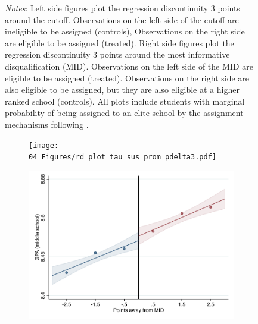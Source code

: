 \documentclass[oneside,11pt]{article}
\begin{document}
\begin{figure}[H]
\footnotesize
\textit{Notes}: Left side figures plot the regression discontinuity 3 points around the cutoff. Observations on the left side of the cutoff are ineligible to be assigned (controls), Observations on the right side are eligible to be assigned (treated). Right side figures plot the regression discontinuity 3 points around the most informative disqualification (MID). Observations on the left side of the MID are eligible to be assigned (treated). Observations on the right side are also eligible to be assigned, but they are also eligible at a higher ranked school (controls). All plots include students with marginal probability of being assigned to an elite school by the assignment mechanisms following \citet{abdulkadirouglu2022breaking}. 
\end{figure}

\begin{figure}[H]

    \ContinuedFloat
    \caption{(Continued) RD plots for balance variables across those assigned to either UNAM or IPN high-school, and those who are not\label{fig:Balance_rd_plot_elite_2}}
    \begin{center}
    
    \begin{subfigure}{0.475\textwidth}
        \centering
        \texttt{[image: 04\_Figures/rd\_plot\_tau\_sus\_prom\_pdelta3.pdf]}
    \end{subfigure}
    \begin{subfigure}{0.475\textwidth}
        \centering
        \includegraphics[width=\textwidth]{04_Figures/rd_plot_mid_sus_prom_pdelta3.pdf}
    \end{subfigure}


\end{center}
\end{figure}
\end{document}
